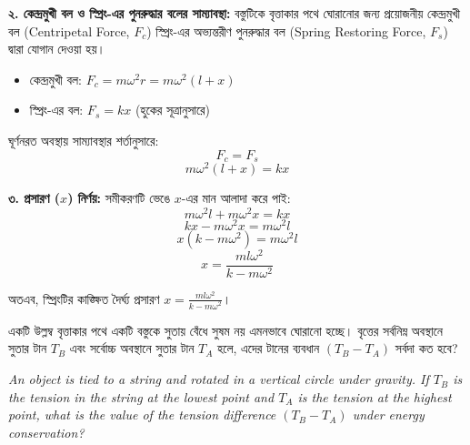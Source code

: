 \documentclass[12pt, a4paper]{article}
\begin{document}
{\begin{tcolorbox}[solutionbox={সমাধান (Solution)}]
\textbf{২. কেন্দ্রমুখী বল ও স্প্রিং-এর পুনরুদ্ধার বলের সাম্যাবস্থা:}
বস্তুটিকে বৃত্তাকার পথে ঘোরানোর জন্য প্রয়োজনীয় কেন্দ্রমুখী বল (Centripetal Force, $F_c$) স্প্রিং-এর অভ্যন্তরীণ পুনরুদ্ধার বল (Spring Restoring Force, $F_s$) দ্বারা যোগান দেওয়া হয়।
\begin{itemize}[leftmargin=1.5em, itemsep=0.2em]
    \item কেন্দ্রমুখী বল: $F_c = m \omega^2 r = m \omega^2 (l + x)$
    \item স্প্রিং-এর বল: $F_s = k x$ (হুকের সূত্রানুসারে)
\end{itemize}
ঘূর্ণনরত অবস্থায় সাম্যাবস্থার শর্তানুসারে:
$$F_c = F_s$$
$$m \omega^2 (l + x) = k x$$

\textbf{৩. প্রসারণ ($x$) নির্ণয়:}
সমীকরণটি ভেঙে $x$-এর মান আলাদা করে পাই:
$$m \omega^2 l + m \omega^2 x = k x$$
$$k x - m \omega^2 x = m \omega^2 l$$
$$x (k - m \omega^2) = m \omega^2 l$$
$$x = \frac{m l \omega^2}{k - m \omega^2}$$

অতএব, স্প্রিংটির কাঙ্ক্ষিত দৈর্ঘ্য প্রসারণ $x = \frac{m l \omega^2}{k - m \omega^2}$।
\end{tcolorbox}
\vspace{1em}


\begin{tcolorbox}[questionbox={প্রশ্ন (Question) 30}]
\noindent
একটি উল্লম্ব বৃত্তাকার পথে একটি বস্তুকে সুতায় বেঁধে সুষম নয় এমনভাবে ঘোরানো হচ্ছে। বৃত্তের সর্বনিম্ন অবস্থানে সুতার টান $T_B$ এবং সর্বোচ্চ অবস্থানে সুতার টান $T_A$ হলে, এদের টানের ব্যবধান $(T_B - T_A)$ সর্বদা কত হবে?

\vspace{0.8em}
\begin{english}
\noindent\textit{\color{darkgray}
An object is tied to a string and rotated in a vertical circle under gravity. If $T_B$ is the tension in the string at the lowest point and $T_A$ is the tension at the highest point, what is the value of the tension difference $(T_B - T_A)$ under energy conservation?
}
\end{english}
\end{tcolorbox}

\vspace{1em}
\begin{center}
\end{center}}
\end{document}
